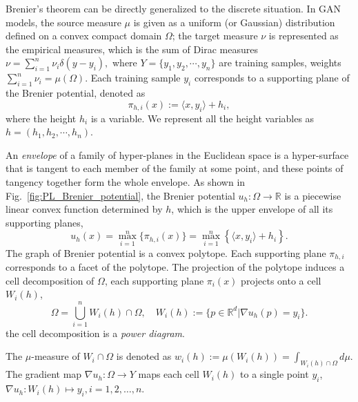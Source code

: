 \documentclass{article}
\begin{document}
Brenier's theorem can be directly generalized to the discrete situation. In GAN models, the source measure $\mu$ is given as a uniform (or Gaussian) distribution defined on a convex compact domain $\Omega$; the target measure $\nu$ is represented as the empirical measures, which is the sum of Dirac measures
$%
    \nu = \sum_{i=1}^n \nu_i \delta(y-y_i),
    \label{eqn:discrete_target_measure}
$%
where $Y=\{y_1,y_2,\cdots,y_n\}$ are training samples, weights $\sum_{i=1}^n \nu_i = \mu(\Omega)$. Each training sample $y_i$ corresponds to a supporting plane of the Brenier potential, denoted as
\begin{equation}
    \pi_{h,i}(x):=\langle x,y_i \rangle +h_i,
\end{equation}
where the height $h_i$ is a variable. We represent all the height variables as $h=(h_1,h_2,\cdots,h_n)$.

An \emph{envelope} of a family of hyper-planes in the Euclidean space is a hyper-surface that is tangent to each member of the family at some point, and these points of tangency together form the whole envelope. As shown in Fig.~\ref{fig:PL_Brenier_potential}, the Brenier potential $ u_h:\Omega\to \mathbb{R}$ is a piecewise linear convex function determined by $h$, which is the upper envelope of all its supporting planes,
\begin{equation}
    u_h(x) = \max_{i=1}^n \{\pi_{h,i}(x)\} = \max_{i=1}^n \left\{\langle x, y_i\rangle + h_i\right\}.
    \label{eqn:PL_Brenier_potential}
\end{equation}
The graph of Brenier potential is a convex polytope. Each supporting plane $\pi_{h,i}$ corresponds to a facet of the polytope. The projection of the polytope induces a cell decomposition of $\Omega$, each supporting plane $\pi_i(x)$ projects onto a cell $W_i(h)$,
\begin{equation}
    \Omega = \bigcup_{i=1}^n W_i(h) \cap\Omega, \quad W_i(h) := \{ p \in \mathbb{R}^d | \nabla u_h(p) = y_i \}.
    \label{eqn:cell}
\end{equation}
the cell decomposition is a \emph{power diagram}.

The $\mu$-measure of $W_i\cap\Omega$ is denoted as %
$%
    w_i(h) := \mu(W_i(h)) = \int_{W_i(h)\cap \Omega} d\mu.
$%
The gradient map $\nabla u_h:\Omega\to Y$ maps each cell $W_i(h)$ to a single point $y_i$,
$%
    \nabla u_h : W_i(h)\mapsto y_i, i = 1,2,\dots, n.
$%
\end{document}

